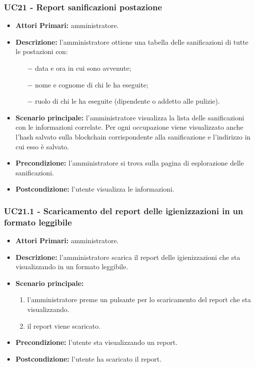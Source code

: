 \subsubsection{ UC21 - Report sanificazioni postazione}
\begin{itemize}
           	\item\textbf{Attori Primari:} 
           	amministratore.
           	\item\textbf{Descrizione:} 
           	l'amministratore ottiene una tabella delle sanificazioni di tutte le postazioni con:
           	\begin{itemize}
           		\item[$-$] data e ora in cui sono avvenute;
           		\item[$-$] nome e cognome di chi le ha eseguite;
           		\item[$-$] ruolo di chi le ha eseguite (dipendente o addetto alle pulizie).
           	\end{itemize}
           	\item\textbf{Scenario principale:} 
           	l'amministratore visualizza la lista delle sanificazioni con le informazioni correlate. Per ogni occupazione viene visualizzato anche l'hash salvato sulla blockchain corrispondente alla sanificazione e l'indirizzo in cui esso è salvato.
           	\item\textbf{Precondizione:} 
           	l'amministratore si trova sulla pagina di esplorazione delle sanificazioni.
           	\item\textbf{Postcondizione:}
           	l'utente visualizza le informazioni.
\end{itemize}

\subsubsection{ UC21.1 - Scaricamento del report delle igienizzazioni in un formato leggibile}
\begin{itemize}
	\item\textbf{Attori Primari:} 
	amministratore.
	\item\textbf{Descrizione:} 
	l'amministratore scarica il report delle igienizzazioni che sta visualizzando in un formato leggibile.
	\item\textbf{Scenario principale:} 
	\begin{enumerate}
		\item l'amministratore preme un pulsante per lo scaricamento del report che sta visualizzando.
		\item il report viene scaricato.
	\end{enumerate}
	\item\textbf{Precondizione:} 
	l'utente sta visualizzando un report.
	\item\textbf{Postcondizione:}
	l'utente ha scaricato il report.
\end{itemize}

